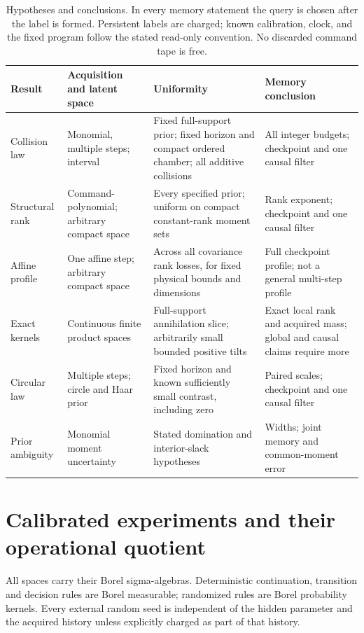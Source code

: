 \documentclass[11pt]{amsart}
\theoremstyle{definition}\newtheorem{definition}[theorem]{Definition}
\theoremstyle{remark}\newtheorem{remark}[theorem]{Remark}
\begin{document}
\begin{table}[tbp]
\centering\footnotesize
\setlength{\tabcolsep}{4pt}
\begin{tabular}{@{}p{}p{}p{}p{}@{}}
\toprule
Result & Acquisition and latent space & Uniformity & Memory conclusion\\
\midrule
Collision law & Monomial, multiple steps; interval & Fixed full-support
prior; fixed horizon and compact ordered chamber; all additive collisions
& All integer budgets; checkpoint and one causal filter\\[3pt]
Structural rank & Command-polynomial; arbitrary compact space & Every
specified prior; uniform on compact constant-rank moment sets & Rank
exponent; checkpoint and one causal filter\\[3pt]
Affine profile & One affine step; arbitrary compact space & Across all
covariance rank losses, for fixed physical bounds and dimensions & Full
checkpoint profile; not a general multi-step profile\\[3pt]
Exact kernels & Continuous finite product spaces & Full-support
annihilation slice; arbitrarily small bounded positive tilts & Exact local
rank and acquired mass; global and causal claims require more\\[3pt]
Circular law & Multiple steps; circle and Haar prior & Fixed horizon and
known sufficiently small contrast, including zero & Paired scales;
checkpoint and one causal filter\\[3pt]
Prior ambiguity & Monomial moment uncertainty & Stated domination and
interior-slack hypotheses & Widths; joint memory and common-moment error\\
\bottomrule
\end{tabular}
\caption{Hypotheses and conclusions. In every memory statement the query
is chosen after the label is formed. Persistent labels are charged;
known calibration, clock, and the fixed program follow the stated
read-only convention. No discarded command tape is free.}
\label{tab:scope}
\end{table}

\section{Calibrated experiments and their operational quotient}\label{sec:experiment}
All spaces carry their Borel sigma-algebras. Deterministic continuation,
transition and decision rules are Borel measurable; randomized rules are
Borel probability kernels. Every external random seed is independent of
the hidden parameter and the acquired history unless explicitly charged
as part of that history.
\end{document}
